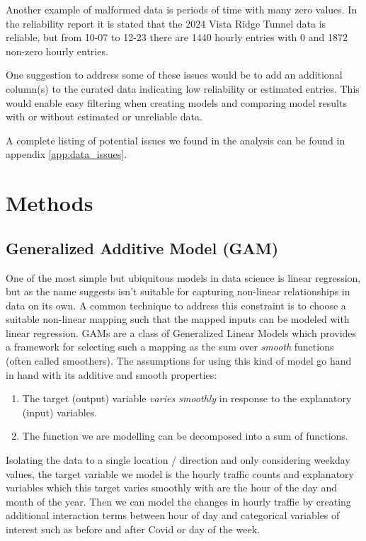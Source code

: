 \documentclass{article}
\begin{document}
\begin{enumerate}
        Another example of malformed data is periods of time with many zero values. In the reliability report it is stated that the 2024 Vista Ridge Tunnel data is reliable, but from 10-07 to 12-23 there are 1440 hourly entries with 0 and 1872 non-zero hourly entries.

        One suggestion to address some of these issues would be to add an additional column(s) to the curated data indicating low reliability or estimated entries. This would enable easy filtering when creating models and comparing model results with or without estimated or unreliable data.
\end{enumerate}

A complete listing of potential issues we found in the analysis can be found in appendix \ref{app:data_issues}. 

\section{Methods}

\subsection{Generalized Additive Model (GAM)}

One of the most simple but ubiquitous models in data science is linear regression, but as the name suggests isn't suitable for capturing non-linear relationships in data on its own. A common technique to address this constraint is to choose a suitable non-linear mapping such that the mapped inputs can be modeled with linear regression. GAMs are a class of Generalized Linear Models which provides a framework for selecting such a mapping as the sum over \emph{smooth} functions (often called smoothers). The assumptions for using this kind of model go hand in hand with its additive and smooth properties:
\begin{enumerate}
    \item The target (output) variable \emph{varies smoothly} in response to the explanatory (input) variables. 
    \item The function we are modelling can be decomposed into a sum of functions. 
\end{enumerate}

Isolating the data to a single location / direction and only considering weekday values, the target variable we model is the hourly traffic counts and explanatory variables which this target varies smoothly with are the hour of the day and month of the year. Then we can model the changes in hourly traffic by creating additional interaction terms between hour of day and categorical variables of interest such as before and after Covid or day of the week.
\end{document}
